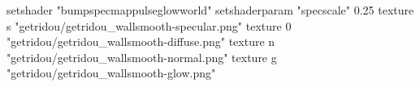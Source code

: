 setshader "bumpspecmappulseglowworld"
setshaderparam "specscale" 0.25
texture s "getridou/getridou_wallsmooth-specular.png"
texture 0 "getridou/getridou_wallsmooth-diffuse.png"
texture n "getridou/getridou_wallsmooth-normal.png"
texture g "getridou/getridou_wallsmooth-glow.png"
